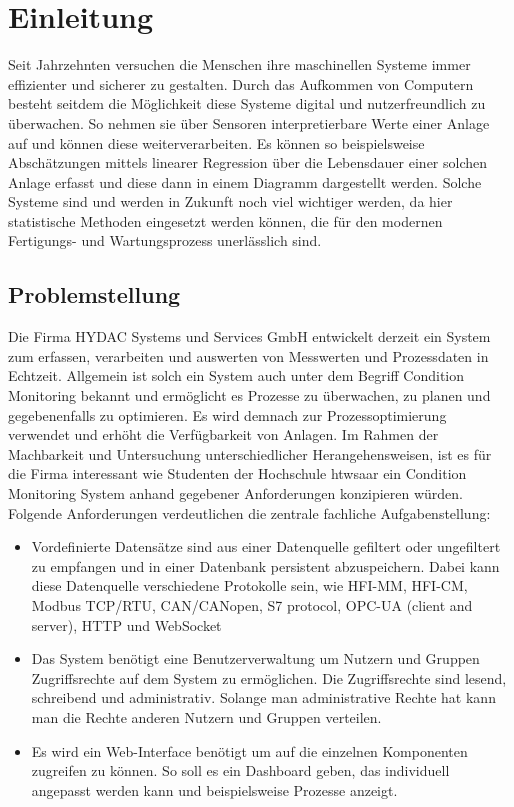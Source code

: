 \chapter{Einleitung}
\label{ch:Einleitung}
Seit Jahrzehnten versuchen die Menschen ihre maschinellen Systeme immer effizienter und sicherer zu gestalten. Durch das Aufkommen von Computern besteht seitdem die Möglichkeit diese Systeme digital und nutzerfreundlich zu überwachen. So nehmen sie über Sensoren interpretierbare Werte einer Anlage auf und können diese weiterverarbeiten. Es können so beispielsweise Abschätzungen mittels linearer Regression über die Lebensdauer einer solchen Anlage erfasst und diese dann in einem Diagramm dargestellt werden. Solche Systeme sind und werden in Zukunft noch viel wichtiger werden, da hier statistische Methoden eingesetzt werden können, die für den modernen Fertigungs- und Wartungsprozess unerlässlich sind.

\section{Problemstellung}
Die Firma HYDAC Systems und Services GmbH entwickelt derzeit ein System zum erfassen, verarbeiten und auswerten von Messwerten und Prozessdaten in Echtzeit. Allgemein ist solch ein System auch unter dem Begriff Condition Monitoring bekannt und ermöglicht es Prozesse zu überwachen, zu planen und gegebenenfalls zu optimieren. Es wird demnach zur Prozessoptimierung verwendet und erhöht die Verfügbarkeit von Anlagen. Im Rahmen der Machbarkeit und Untersuchung unterschiedlicher Herangehensweisen, ist es für die Firma interessant wie Studenten der Hochschule htwsaar ein Condition Monitoring System anhand gegebener Anforderungen konzipieren würden. Folgende Anforderungen verdeutlichen die zentrale fachliche Aufgabenstellung:
\begin{itemize}
	\item Vordefinierte Datensätze sind aus einer Datenquelle gefiltert oder ungefiltert zu empfangen und in einer Datenbank persistent abzuspeichern. Dabei kann diese Datenquelle verschiedene Protokolle sein, wie HFI-MM, HFI-CM, Modbus TCP/RTU, CAN/CANopen, S7 protocol, OPC-UA (client and server), HTTP und WebSocket
	\item Das System benötigt eine Benutzerverwaltung um Nutzern und Gruppen Zugriffsrechte auf dem System zu ermöglichen. Die Zugriffsrechte sind lesend, schreibend und administrativ.  Solange man administrative Rechte hat kann man die Rechte anderen Nutzern und Gruppen verteilen.
	\item Es wird ein Web-Interface benötigt um auf die einzelnen Komponenten zugreifen zu können. So soll es ein Dashboard geben, das individuell angepasst werden kann und beispielsweise Prozesse anzeigt.
\end{itemize}

